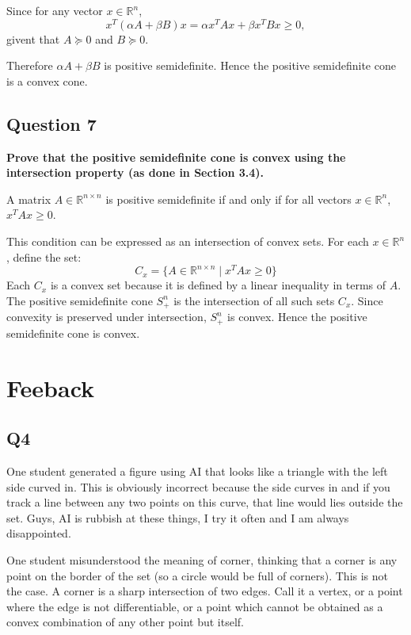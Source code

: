 Since for any vector \( x \in \mathbb{R}^n \),
\[
x^T (\alpha A + \beta B) x = \alpha x^T A x + \beta x^T B x \geq 0,
\]
givent that \( A \succeq 0 \) and \( B \succeq 0 \).

Therefore \( \alpha A + \beta B \) is positive semidefinite. Hence the positive semidefinite cone is a convex cone.

\subsection*{Question 7}
\textbf{Prove that the positive semideﬁnite cone is convex using the intersection property (as done in Section 3.4).}

A matrix \( A \in \mathbb{R}^{n \times n} \) is positive semidefinite if and only if for all vectors \( x \in \mathbb{R}^n \), \( x^T A x \geq 0 \).

This condition can be expressed as an intersection of convex sets. For each \( x \in \mathbb{R}^n \), define the set:
\[
C_x = \{ A \in \mathbb{R}^{n \times n} \mid x^T A x \geq 0 \}
\]
Each \( C_x \) is a convex set because it is defined by a linear inequality in terms of \( A \). The positive semidefinite cone \( S_+^n \) is the intersection of all such sets \( C_x \). Since convexity is preserved under intersection, \( S_+^n \) is convex. Hence the positive semidefinite cone is convex. 

\newpage

\section*{Feeback}

\subsection*{Q4}

One student generated a figure using AI that looks like a triangle with the left side curved in. This is obviously incorrect because the side curves in and if you track a line between any two points on this curve, that line would lies outside the set. Guys, AI is rubbish at these things, I try it often and I am always disappointed. 

One student misunderstood the meaning of corner, thinking that a corner is any point on the border of the set (so a circle would be full of corners). This is not the case. A corner is a sharp intersection of two edges. Call it a vertex, or a point where the edge is not differentiable, or a point which cannot be obtained as a convex combination of any other point but itself.

